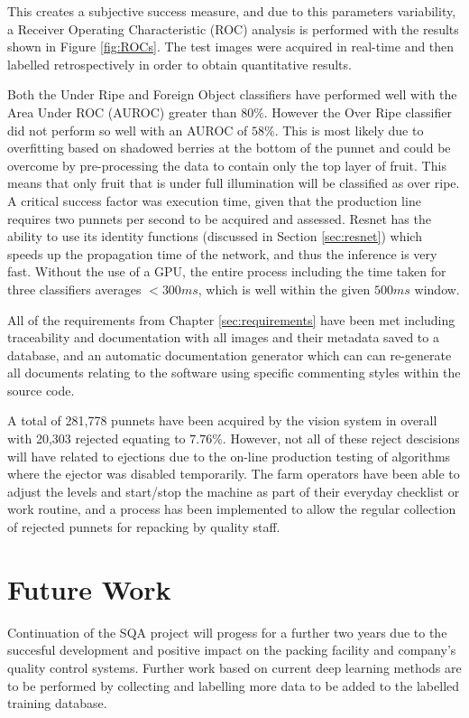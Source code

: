 \documentclass[fleqn,twoside,12pt]{report}
\begin{document}
This creates a subjective success measure, and due to this parameters variability, a Receiver Operating Characteristic (ROC) analysis  is performed with the results shown in Figure \ref{fig:ROCs}. The test images were acquired in real-time and then labelled retrospectively in order to obtain quantitative results.

Both the Under Ripe and Foreign Object classifiers have performed well with the  Area Under ROC (AUROC) greater than $80\%$. However the Over Ripe classifier did not perform so well with an AUROC of $58\%$. This is most likely due to overfitting based on shadowed berries at the bottom of the punnet and could be overcome by pre-processing the data to contain only the top layer of fruit. This means that only fruit that is under full illumination will be classified as over ripe. A critical success factor was execution time, given that the production line requires two punnets per second to be acquired and assessed. Resnet has the ability to use its identity functions (discussed in Section \ref{sec:resnet}) which speeds up the propagation time of the network, and thus the inference is very fast. Without the use of a GPU, the entire process including the time taken for three classifiers averages $<300ms$, which is well within the given $500ms$ window.  

All of the requirements from Chapter \ref{sec:requirements} have been met including traceability and documentation with all images and their metadata saved to a database, and an automatic documentation generator which can can re-generate all documents relating to the software using specific commenting styles within the source code.

A total of 281,778 punnets have been acquired by the vision system in overall with 20,303 rejected equating to $7.76\%$. However, not all of these reject descisions will have related to ejections due to the on-line production testing of algorithms where the ejector was disabled temporarily. The farm operators have been able to adjust the levels and start/stop the machine as part of their everyday checklist or work routine, and a process has been implemented to allow the regular collection of rejected punnets for repacking by quality staff.



\section{Future Work}

Continuation of the SQA project will progess for a further two years due to the succesful development and positive impact on the packing facility and company's quality control systems. Further work based on current deep learning methods are to be performed by collecting and labelling more data to be added to the labelled training database. 
\end{document}

